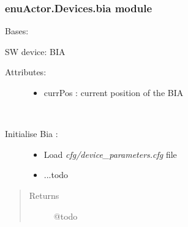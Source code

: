 \documentclass[letterpaper,10pt,english]{sphinxmanual}
\begin{document}
\subsubsection{enuActor.Devices.bia module}
\label{enuActor.Devices:enuactor-devices-bia-module}\label{enuActor.Devices:module-enuActor.Devices.bia}

\begin{fulllineitems}
\label{enuActor.Devices:enuActor.Devices.bia.Bia}
Bases: {\hyperref[enuActor.Devices:enuActor.Devices.Device.DualModeDevice]{}}

SW device: BIA
\begin{description}
\item[{Attributes:}] \leavevmode\begin{itemize}
\item {} 
currPos : current position of the BIA

\end{itemize}

\end{description}

\begin{fulllineitems}
\label{enuActor.Devices:enuActor.Devices.bia.Bia.bia}
\end{fulllineitems}


\begin{fulllineitems}
\label{enuActor.Devices:enuActor.Devices.bia.Bia.initialise}~\begin{description}
\item[{Initialise Bia :}] \leavevmode\begin{itemize}
\item {} 
Load \emph{cfg/device\_parameters.cfg} file

\item {} 
...todo

\end{itemize}

\end{description}
\begin{quote}\begin{description}
\item[{Returns}] \leavevmode
@todo


\end{description}
\end{quote}
\end{fulllineitems}
\end{fulllineitems}
\end{document}
